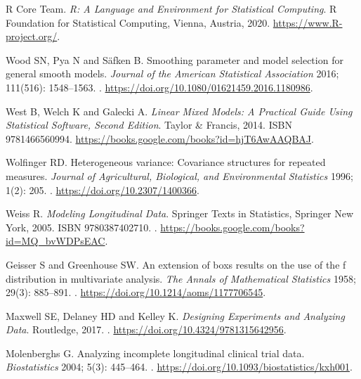 \documentclass[Royal,times,doublespace,sagev]{sagej}
\begin{document}
\begin{thebibliography}{10}
{R Core Team}.
\newblock \emph{R: A Language and Environment for Statistical Computing}.
\newblock R Foundation for Statistical Computing, Vienna, Austria, 2020.
\newblock \urlprefix\url{https://www.R-project.org/}.

Wood SN, Pya N and S\"{a}fken B.
\newblock Smoothing parameter and model selection for general smooth models.
\newblock \emph{Journal of the American Statistical Association} 2016;
  111(516): 1548--1563.
\newblock {}.
\newblock \urlprefix\url{https://doi.org/10.1080/01621459.2016.1180986}.

West B, Welch K and Galecki A.
\newblock \emph{Linear Mixed Models: A Practical Guide Using Statistical
  Software, Second Edition}.
\newblock Taylor \& Francis, 2014.
\newblock ISBN 9781466560994.
\newblock \urlprefix\url{https://books.google.com/books?id=hjT6AwAAQBAJ}.

Wolfinger RD.
\newblock Heterogeneous variance: Covariance structures for repeated measures.
\newblock \emph{Journal of Agricultural, Biological, and Environmental
  Statistics} 1996; 1(2): 205.
\newblock {}.
\newblock \urlprefix\url{https://doi.org/10.2307/1400366}.

Weiss R.
\newblock \emph{Modeling Longitudinal Data}.
\newblock Springer Texts in Statistics, Springer New York, 2005.
\newblock ISBN 9780387402710.
\newblock {}.
\newblock \urlprefix\url{https://books.google.com/books?id=MQ\_bvWDPsEAC}.

Geisser S and Greenhouse SW.
\newblock An extension of box{\textquotesingle}s results on the use of the
  {\textdollar}f{\textdollar} distribution in multivariate analysis.
\newblock \emph{The Annals of Mathematical Statistics} 1958; 29(3): 885--891.
\newblock {}.
\newblock \urlprefix\url{https://doi.org/10.1214/aoms/1177706545}.

Maxwell SE, Delaney HD and Kelley K.
\newblock \emph{Designing Experiments and Analyzing Data}.
\newblock Routledge, 2017.
\newblock {}.
\newblock \urlprefix\url{https://doi.org/10.4324/9781315642956}.

Molenberghs G.
\newblock Analyzing incomplete longitudinal clinical trial data.
\newblock \emph{Biostatistics} 2004; 5(3): 445--464.
\newblock {}.
\newblock \urlprefix\url{https://doi.org/10.1093/biostatistics/kxh001}.


\end{thebibliography}
\end{document}
